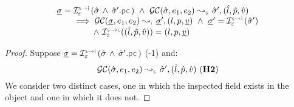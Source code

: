 \begin{lemma}\label{soundiness:getcell}
$$
\begin{array}{l}
\istate = \interpret{\symbinst}{\senv}(\sstate \, \wedge \, \sstate'.\pcsel)  \ \wedge \ 
\absgetcellrule{\symbolic}{\sstate, \jsilexpr_1, \jsilexpr_2}{\sstate', (\sloc, \sexprp, \sexprv)} \\ \quad \quad
  \implies \absgetcellrule{\instrumented}{\istate, \jsilexpr_1, \jsilexpr_2}{\istate', (\loc, p, \ival)} 
     \ \wedge \ \istate' = \interpret{\symbinst}{\senv}(\sstate') \\ \qquad \qquad
     \ \wedge \ \interpret{\symbconc}{\senv}((\sloc, \sexprp, \sexprv)) = (\loc, p, \ival)
\end{array}
$$
 \end{lemma}
 \begin{proof}
 Suppose $\istate = \interpret{\symbinst}{\senv}(\sstate \, \wedge \, \sstate'.\pcsel)$ (\hyp{1}) 
 and:
 $$\absgetcellrule{\symbolic}{\sstate, \jsilexpr_1, \jsilexpr_2}{\sstate', (\sloc, \sexprp, \sexprv)} \text{ (\hyp{2})}
 $$ 
 We consider two distinct cases, one in which the inspected field exists 
 in the object and one in which it does not. 
 \vspace{3pt} 
 

\end{proof}
